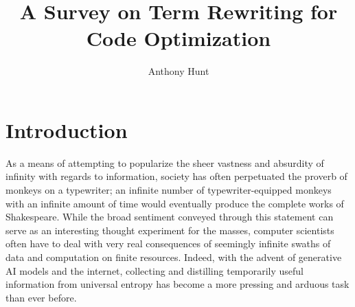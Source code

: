 \documentclass{article}
\title{A Survey on Term Rewriting for Code Optimization}
\author{Anthony Hunt}
\begin{document}
\maketitle
\tableofcontents

\section{Introduction}













As a means of attempting to popularize the sheer vastness and absurdity of infinity with regards to information, society has often perpetuated the proverb of monkeys on a typewriter;
an infinite number of typewriter-equipped monkeys with an infinite amount of time would eventually produce the complete works of Shakespeare.
While the broad sentiment conveyed through this statement can serve as an interesting thought experiment for the masses,
computer scientists often have to deal with very real consequences of seemingly infinite swaths of data and computation on finite resources.
Indeed, with the advent of generative AI models and the internet, collecting and distilling temporarily useful information from universal entropy
has become a more pressing and arduous task than ever before.
\end{document}

